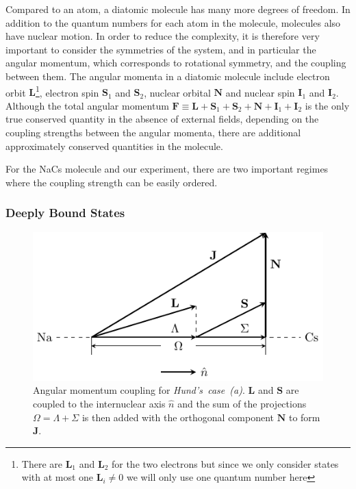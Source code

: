 Compared to an atom, a diatomic molecule has many more degrees of freedom.
In addition to the quantum numbers for each atom in the molecule,
molecules also have nuclear motion.
In order to reduce the complexity, it is therefore very important to consider the
symmetries of the system, and in particular the angular momentum,
which corresponds to rotational symmetry, and the coupling between them.
The angular momenta in a diatomic molecule include electron orbit $\mathbf{L}$\footnote{
  There are $\mathbf{L}_1$ and $\mathbf{L}_2$ for the two electrons but since
  we only consider states with at most one $\mathbf{L}_i\neq0$
  we will only use one quantum number here},
electron spin $\mathbf{S}_1$ and $\mathbf{S}_2$, nuclear orbital $\mathbf{N}$
and nuclear spin $\mathbf{I}_1$ and $\mathbf{I}_2$.
Although the total angular momentum
$\mathbf{F}\equiv\mathbf{L}+\mathbf{S}_1+\mathbf{S}_2+\mathbf{N}+\mathbf{I}_1+\mathbf{I}_2$
is the only true conserved quantity in the absence of external fields,
depending on the coupling strengths between the angular momenta,
there are additional approximately conserved quantities in the molecule.

For the NaCs molecule and our experiment, there are two important regimes where the coupling
strength can be easily ordered.

\subsubsection{Deeply Bound States}
\label{ch:pa:angular-momenta:deep}

\begin{figure}
  \centering
  \includegraphics[width=\textwidth]{figures/pa_hunds_case_a.pdf}
  \caption[Hund's~case~(a)]{
    Angular momentum coupling for \textit{Hund's~case~(a)}.
    $\mathbf{L}$ and $\mathbf{S}$ are coupled to the internuclear axis $\hat n$
    and the sum of the projections $\Omega=\Lambda+\Sigma$ is then
    added with the orthogonal component $\mathbf{N}$ to form $\mathbf{J}$.
    \label{fig:pa:hunds-case-a}}
\end{figure}

